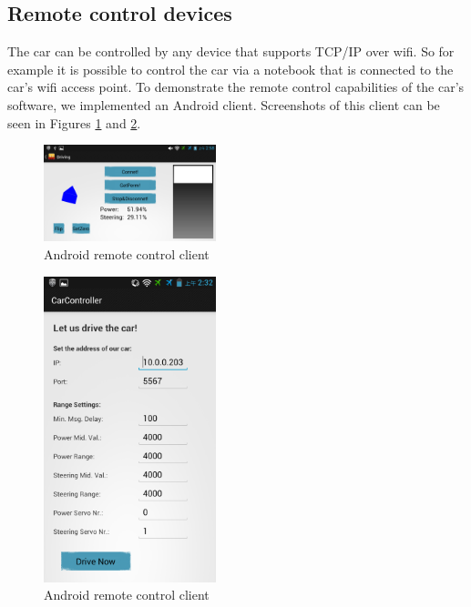 \documentclass[12pt]{article}
\begin{document}
\subsection{Remote control devices}
The car can be controlled by any device that supports TCP/IP over wifi.
So for example it is possible to control the car via a notebook that is connected to the car's wifi access point.
To demonstrate the remote control capabilities of the car's software, we implemented an Android client. Screenshots of this client can be seen in Figures \ref{figand1} and \ref{figand2}.
\begin{figure}[h]
\begin{center}
\includegraphics[width=5cm]{pic/figand1.png}
\caption{Android remote control client}
\end{center}
\label{figand1}
\end{figure}
\begin{figure}[h]
\begin{center}
\includegraphics[width=5cm]{pic/figand2.png}
\caption{Android remote control client}
\end{center}
\label{figand2}
\end{figure}
\end{document}
